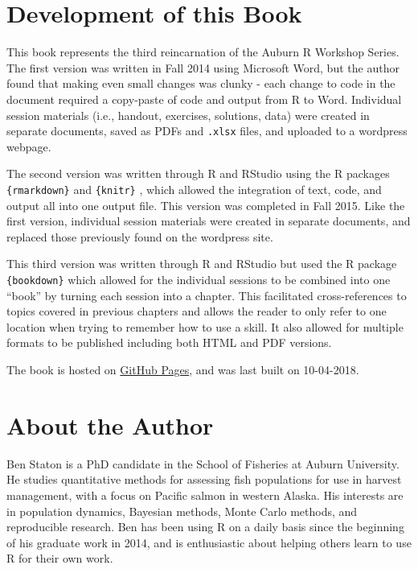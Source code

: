 \documentclass[]{book}
\theoremstyle{definition}
\theoremstyle{definition}
\theoremstyle{definition}
\theoremstyle{remark}
\begin{document}
\section*{Development of this Book}\label{development-of-this-book}

This book represents the third reincarnation of the Auburn R Workshop
Series. The first version was written in Fall 2014 using Microsoft Word,
but the author found that making even small changes was clunky - each
change to code in the document required a copy-paste of code and output
from R to Word. Individual session materials (i.e., handout, exercises,
solutions, data) were created in separate documents, saved as PDFs and
\texttt{.xlsx} files, and uploaded to a wordpress webpage.

The second version was written through R \citep{R-base} and RStudio
using the R packages \texttt{\{rmarkdown\}} \citep{R-rmarkdown} and
\texttt{\{knitr\}} \citep{R-knitr, knitr-cite}, which allowed the
integration of text, code, and output all into one output file. This
version was completed in Fall 2015. Like the first version, individual
session materials were created in separate documents, and replaced those
previously found on the wordpress site.

This third version was written through R and RStudio but used the R
package \texttt{\{bookdown\}} \citep{R-bookdown} which allowed for the
individual sessions to be combined into one ``book'' by turning each
session into a chapter. This facilitated cross-references to topics
covered in previous chapters and allows the reader to only refer to one
location when trying to remember how to use a skill. It also allowed for
multiple formats to be published including both HTML and PDF versions.

The book is hosted on \href{https://pages.github.com/}{GitHub Pages},
and was last built on 10-04-2018.

\section*{About the Author}\label{about-the-author}

Ben Staton is a PhD candidate in the School of Fisheries at Auburn
University. He studies quantitative methods for assessing fish
populations for use in harvest management, with a focus on Pacific
salmon in western Alaska. His interests are in population dynamics,
Bayesian methods, Monte Carlo methods, and reproducible research. Ben
has been using R on a daily basis since the beginning of his graduate
work in 2014, and is enthusiastic about helping others learn to use R
for their own work.
\end{document}
